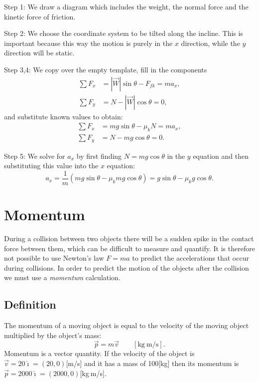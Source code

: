 \documentclass[letterpaper,9pt,journal]{IEEEtran}
\newcommand{\be}{\begin{equation}}
\newcommand{\ee}{\end{equation}}
\begin{document}
Step 1: We draw a diagram which includes the weight, the normal force and the kinetic force of friction.

Step 2: We choose the coordinate system to be tilted along the incline. This is important because this way the motion is purely  in the $x$ direction,
while the $y$ direction will be static.


Step 3,4: We copy over the empty template, fill in the components
\begin{align*}
 \sum F_x  &= |\vec{W}|\sin\theta - F_{fk}  = ma_x, \\
 \sum F_y &= N - |\vec{W}|\cos\theta  = 0, 
\end{align*}
and substitute known values to obtain:
\begin{align*}
 \sum F_x &= mg\sin\theta - \mu_kN  = ma_x, \\
 \sum F_y &= N - mg\cos\theta  = 0. 
\end{align*}

Step 5: We solve for $a_x$ by first finding $N=mg\cos\theta$ in the $y$ equation 
and then substituting this value into the $x$ equation:
\[
 a_x 
 = \frac{1}{m}\left( mg\sin\theta - \mu_k mg\cos\theta \right)
 = g\sin\theta - \mu_k g\cos\theta.
\]




\section{Momentum}
\label{sec:momentum}

During a collision between two objects there will be a sudden spike in the contact force between them,
which can be difficult to measure and quantify. 
It is therefore not possible to use Newton's law $F=ma$ to predict the accelerations that occur during collisions.
In order to predict the motion of the objects after the collision we must use a \emph{momentum} calculation.

\vspace{-3mm}
\subsection{Definition}

The momentum of a moving object is equal to the velocity of the moving object 
multiplied by the object's mass:
\be 
 \vec{p} = m\vec{v} \qquad [\text{kg}\:\text{m}/\text{s}].
 \label{MOMENTUM}
\ee
Momentum is a vector quantity.
If the velocity of the object is $\vec{v}=20\hat{\imath}=(20,0)$[m/s]
and it has a mass of 100[kg] then its momentum is $\vec{p}=2000\hat{\imath}=(2000,0)$[kg$\:$m/s].
\end{document}
